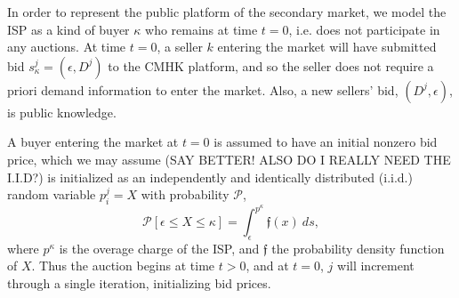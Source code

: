 \documentclass[sigconf, anonymous]{acmart}
\theoremstyle{definition}
\begin{document}
In order to represent the public platform of the secondary market, we model the ISP as
a kind of buyer $\kappa$ who remains at time $t=0$, i.e. does not participate
in any auctions. At time $t=0$, a seller $k$ entering the market will have
submitted bid $s_\kappa^j =(\epsilon, D^j)$ to the CMHK platform, and so the
seller does not require a priori demand information to enter the market.
Also, a new sellers' bid, $(D^j, \epsilon)$, is public knowledge. 
\iffalse
(DO I WANT UPDATES? MORE OR LESS FAIR? NEED EITHER UPDATE QUANTITY OR BOTH,
IMPLICATIONS?)
We assume that sellers update their bids with the ISP, which is modeled as a
``buyer" $\kappa$. 
\fi
A buyer entering the market
at $t=0$ is assumed to have an initial nonzero bid price, which we may assume
(SAY BETTER! ALSO DO I REALLY NEED THE I.I.D?) is initialized as 
an independently and identically distributed (i.i.d.) random variable $p_i^j=X$ with
probability $\mathcal{P}$,
$$
    \mathcal{P}[\epsilon\le X \le \kappa] =
\displaystyle\int_\epsilon^{p^\kappa} \mathfrak{f}(x) \
ds,
$$
where $p^\kappa$ is the overage charge of the ISP, and $\mathfrak{f}$ the probability
density function of $X$.
Thus the auction
begins at time $t>0$, and at $t=0$, $j$ will increment through a single iteration,
initializing bid prices.
\end{document}
